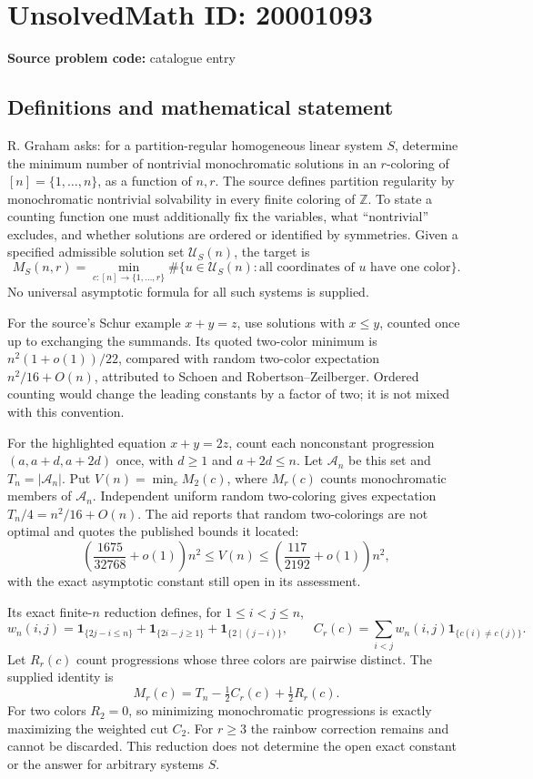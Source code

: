 \documentclass[11pt]{article}
\newcommand{\Z}{\mathbb{Z}}
\begin{document}
\section*{UnsolvedMath ID: 20001093}
\textbf{Source problem code:} catalogue entry
\subsection{Definitions and mathematical statement}
R. Graham asks: for a partition-regular homogeneous linear system $S$, determine the minimum number of nontrivial monochromatic solutions in an $r$-coloring of $[n]=\{1,\ldots,n\}$, as a function of $n,r$. The source defines partition regularity by monochromatic nontrivial solvability in every finite coloring of $\Z$. To state a counting function one must additionally fix the variables, what ``nontrivial'' excludes, and whether solutions are ordered or identified by symmetries. Given a specified admissible solution set $\mathcal U_S(n)$, the target is
\[
 M_S(n,r)=\min_{c:[n]\to\{1,\ldots,r\}}
 \#\{u\in\mathcal U_S(n):\text{all coordinates of }u\text{ have one color}\}.
\]
No universal asymptotic formula for all such systems is supplied.

For the source's Schur example $x+y=z$, use solutions with $x\leq y$, counted once up to exchanging the summands. Its quoted two-color minimum is $n^2(1+o(1))/22$, compared with random two-color expectation $n^2/16+O(n)$, attributed to Schoen and Robertson--Zeilberger. Ordered counting would change the leading constants by a factor of two; it is not mixed with this convention.

For the highlighted equation $x+y=2z$, count each nonconstant progression $(a,a+d,a+2d)$ once, with $d\geq1$ and $a+2d\leq n$. Let $\mathcal A_n$ be this set and $T_n=|\mathcal A_n|$. Put $V(n)=\min_c M_2(c)$, where $M_r(c)$ counts monochromatic members of $\mathcal A_n$. Independent uniform random two-coloring gives expectation $T_n/4=n^2/16+O(n)$. The aid reports that random two-colorings are not optimal and quotes the published bounds it located:
\[
 \left(\frac{1675}{32768}+o(1)\right)n^2
 \leq V(n)\leq
 \left(\frac{117}{2192}+o(1)\right)n^2,
\]
with the exact asymptotic constant still open in its assessment.

Its exact finite-$n$ reduction defines, for $1\leq i<j\leq n$,
\[
 w_n(i,j)=\mathbf1_{\{2j-i\leq n\}}+
 \mathbf1_{\{2i-j\geq1\}}+\mathbf1_{\{2\mid(j-i)\}},\qquad
 C_r(c)=\sum_{i<j}w_n(i,j)\mathbf1_{\{c(i)\ne c(j)\}}.
\]
Let $R_r(c)$ count progressions whose three colors are pairwise distinct. The supplied identity is
\[
 M_r(c)=T_n-\tfrac12 C_r(c)+\tfrac12R_r(c).
\]
For two colors $R_2=0$, so minimizing monochromatic progressions is exactly maximizing the weighted cut $C_2$. For $r\geq3$ the rainbow correction remains and cannot be discarded. This reduction does not determine the open exact constant or the answer for arbitrary systems $S$.
\end{document}
